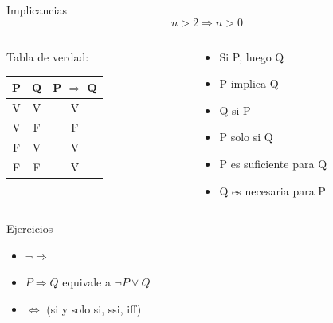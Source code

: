 \documentclass[14pt,aspectratio=169,xcolor=dvipsnames]{beamer}
\begin{document}
\begin{frame}{Implicancias}
    $$ n > 2 \Rightarrow n > 0 $$
    \begin{columns}
        \begin{column}{0.45\textwidth}
            Tabla de verdad:
            \begin{center}
                \begin{tabular}{c c | c}
                    \toprule P & Q & P $\Rightarrow$ Q \\\midrule
                    V & V & V \\
                    V & F & F \\
                    F & V & \alert{V} \\
                    F & F & V  \\ \bottomrule
                \end{tabular}
            \end{center}
        \end{column}
        \begin{column}{0.45\textwidth}
            \begin{itemize}
                \item Si P, luego Q
                \item P implica Q
                \item Q si P
                \item P solo si Q
                \item \alert{P es suficiente para Q}
                \item \alert{Q es necesaria para P}
            \end{itemize}
        \end{column}
    \end{columns}
\end{frame}
\begin{frame}{Ejercicios}
    \begin{itemize}
        \item $\neg \Rightarrow$
        \item $ P\Rightarrow Q$ equivale a $\neg P \vee Q$
        \item $ \Leftrightarrow $  (si y solo si, ssi, iff)
    \end{itemize}
\end{frame}
\begin{frame}
    \maketitle
\end{frame}
\end{document}
